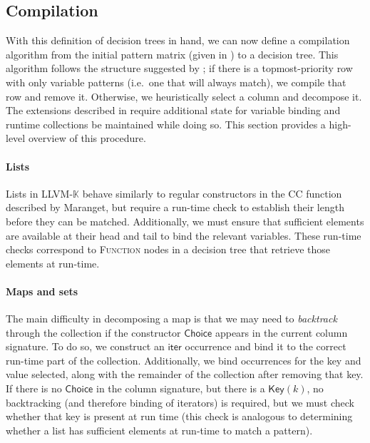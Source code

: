 \documentclass{article}
\theoremstyle{definition}
\newcommand{\K}{$\mathbb{K}$\xspace}
\newcommand{\KL}{LLVM-\K}
\newcommand{\mapkey}{\mathsf{Key}}
\newcommand{\mapchoice}{\mathsf{Choice}}
\newcommand{\iter}{\mathsf{iter}}
\begin{document}
\subsection{Compilation}

With this definition of decision trees in hand, we can now define a compilation
algorithm from the initial pattern matrix (given in ) to a
decision tree. This algorithm follows the structure suggested by
\citet{Maranget2008}; if there is a topmost-priority row with only variable
patterns (i.e.\ one that will always match), we compile that row and remove it.
Otherwise, we heuristically select a column and decompose it. The extensions
described in  require additional state for variable binding and
runtime collections be maintained while doing so. This section provides a
high-level overview of this procedure.



\paragraph{Lists\\} Lists in \KL behave similarly to regular constructors in the
\textsc{CC} function described by Maranget, but require a run-time check to
establish their length before they can be matched. Additionally, we must ensure
that sufficient elements are available at their head and tail to bind the
relevant variables. These run-time checks correspond to \textsc{Function} nodes
in a decision tree that retrieve those elements at run-time.


\paragraph{Maps and sets\\}

The main difficulty in decomposing a map is that we may need to \emph{backtrack}
through the collection if the constructor $ \mapchoice $ appears in the current
column signature. To do so, we construct an $ \iter $ occurrence and bind it to
the correct run-time part of the collection. Additionally, we bind occurrences
for the key and value selected, along with the remainder of the collection after
removing that key. If there is no $ \mapchoice $ in the column signature, but
there is a $ \mapkey(k) $, no backtracking (and therefore binding of iterators)
is required, but we must check whether that key is present at run time (this
check is analogous to determining whether a list has sufficient elements at
run-time to match a pattern).
\end{document}
